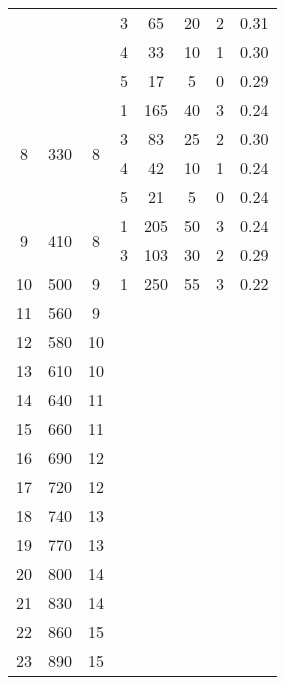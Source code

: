 \begin{longtable}[c]{|c|c|c|c|c|c|c|c|}
    & & & 3 & 65 & 20 & 2 & 0.31 \\\cline{4-8}
    & & & 4 & 33 & 10 & 1 & 0.30 \\\cline{4-8}
    & & & 5 & 17 & 5 & 0 & 0.29 \\\hline
    \multirow{4}{*}{8} & \multirow{4}{*}{330} & \multirow{4}{*}{8} & 1 & 165 & 40 & 3 & 0.24 \\\cline{4-8}
    & & & 3 & 83 & 25 & 2 & 0.30 \\\cline{4-8}
    & & & 4 & 42 & 10 & 1 & 0.24 \\\cline{4-8}
    & & & 5 & 21 & 5 & 0 & 0.24 \\\hline
    \multirow{2}{*}{9} & \multirow{2}{*}{410} & \multirow{2}{*}{8} & 1 & 205 & 50 & 3 & 0.24 \\\cline{4-8}
    & & & 3 & 103 & 30 & 2 & 0.29 \\\hline
    \multirow{1}{*}{10} & \multirow{1}{*}{500} & \multirow{1}{*}{9} & 1 & 250 & 55 & 3 & 0.22 \\\hline
    \multirow{1}{*}{11} & \multirow{1}{*}{560} & \multirow{1}{*}{9} & & & & & \\\hline
    \multirow{1}{*}{12} & \multirow{1}{*}{580} & \multirow{1}{*}{10} & & & & & \\\hline
    \multirow{1}{*}{13} & \multirow{1}{*}{610} & \multirow{1}{*}{10} & & & & & \\\hline
    \multirow{1}{*}{14} & \multirow{1}{*}{640} & \multirow{1}{*}{11} & & & & & \\\hline
    \multirow{1}{*}{15} & \multirow{1}{*}{660} & \multirow{1}{*}{11} & & & & & \\\hline
    \multirow{1}{*}{16} & \multirow{1}{*}{690} & \multirow{1}{*}{12} & & & & & \\\hline
    \multirow{1}{*}{17} & \multirow{1}{*}{720} & \multirow{1}{*}{12} & & & & & \\\hline
    \multirow{1}{*}{18} & \multirow{1}{*}{740} & \multirow{1}{*}{13} & & & & & \\\hline
    \multirow{1}{*}{19} & \multirow{1}{*}{770} & \multirow{1}{*}{13} & & & & & \\\hline
    \multirow{1}{*}{20} & \multirow{1}{*}{800} & \multirow{1}{*}{14} & & & & & \\\hline
    \multirow{1}{*}{21} & \multirow{1}{*}{830} & \multirow{1}{*}{14} & & & & & \\\hline
    \multirow{1}{*}{22} & \multirow{1}{*}{860} & \multirow{1}{*}{15} & & & & & \\\hline
    \multirow{1}{*}{23} & \multirow{1}{*}{890} & \multirow{1}{*}{15} & & & & & \\\hline

\end{longtable}
